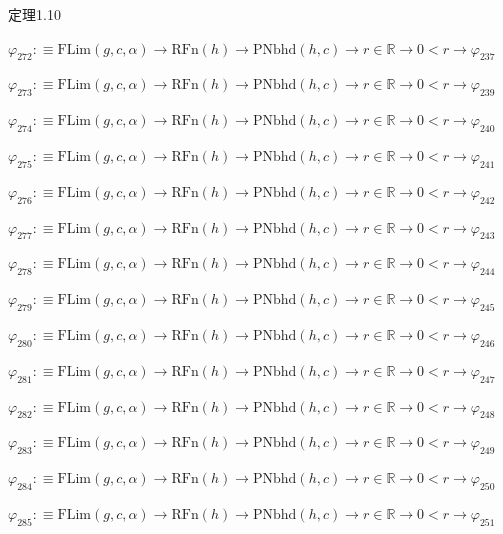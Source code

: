 \begin{fullproof}{定理1.10}
\begin{abbrevlist}
\item $\varphi_{272} :\equiv \mathrm{FLim}(g,c,\alpha) \to \mathrm{RFn}(h) \to \mathrm{PNbhd}(h,c) \to r \in \mathbb{R} \to 0 < r \to \varphi_{237}$
\item $\varphi_{273} :\equiv \mathrm{FLim}(g,c,\alpha) \to \mathrm{RFn}(h) \to \mathrm{PNbhd}(h,c) \to r \in \mathbb{R} \to 0 < r \to \varphi_{239}$
\item $\varphi_{274} :\equiv \mathrm{FLim}(g,c,\alpha) \to \mathrm{RFn}(h) \to \mathrm{PNbhd}(h,c) \to r \in \mathbb{R} \to 0 < r \to \varphi_{240}$
\item $\varphi_{275} :\equiv \mathrm{FLim}(g,c,\alpha) \to \mathrm{RFn}(h) \to \mathrm{PNbhd}(h,c) \to r \in \mathbb{R} \to 0 < r \to \varphi_{241}$
\item $\varphi_{276} :\equiv \mathrm{FLim}(g,c,\alpha) \to \mathrm{RFn}(h) \to \mathrm{PNbhd}(h,c) \to r \in \mathbb{R} \to 0 < r \to \varphi_{242}$
\item $\varphi_{277} :\equiv \mathrm{FLim}(g,c,\alpha) \to \mathrm{RFn}(h) \to \mathrm{PNbhd}(h,c) \to r \in \mathbb{R} \to 0 < r \to \varphi_{243}$
\item $\varphi_{278} :\equiv \mathrm{FLim}(g,c,\alpha) \to \mathrm{RFn}(h) \to \mathrm{PNbhd}(h,c) \to r \in \mathbb{R} \to 0 < r \to \varphi_{244}$
\item $\varphi_{279} :\equiv \mathrm{FLim}(g,c,\alpha) \to \mathrm{RFn}(h) \to \mathrm{PNbhd}(h,c) \to r \in \mathbb{R} \to 0 < r \to \varphi_{245}$
\item $\varphi_{280} :\equiv \mathrm{FLim}(g,c,\alpha) \to \mathrm{RFn}(h) \to \mathrm{PNbhd}(h,c) \to r \in \mathbb{R} \to 0 < r \to \varphi_{246}$
\item $\varphi_{281} :\equiv \mathrm{FLim}(g,c,\alpha) \to \mathrm{RFn}(h) \to \mathrm{PNbhd}(h,c) \to r \in \mathbb{R} \to 0 < r \to \varphi_{247}$
\item $\varphi_{282} :\equiv \mathrm{FLim}(g,c,\alpha) \to \mathrm{RFn}(h) \to \mathrm{PNbhd}(h,c) \to r \in \mathbb{R} \to 0 < r \to \varphi_{248}$
\item $\varphi_{283} :\equiv \mathrm{FLim}(g,c,\alpha) \to \mathrm{RFn}(h) \to \mathrm{PNbhd}(h,c) \to r \in \mathbb{R} \to 0 < r \to \varphi_{249}$
\item $\varphi_{284} :\equiv \mathrm{FLim}(g,c,\alpha) \to \mathrm{RFn}(h) \to \mathrm{PNbhd}(h,c) \to r \in \mathbb{R} \to 0 < r \to \varphi_{250}$
\item $\varphi_{285} :\equiv \mathrm{FLim}(g,c,\alpha) \to \mathrm{RFn}(h) \to \mathrm{PNbhd}(h,c) \to r \in \mathbb{R} \to 0 < r \to \varphi_{251}$

\end{abbrevlist}
\end{fullproof}
